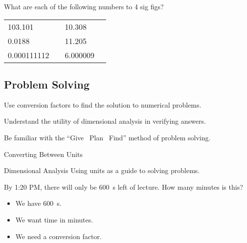 \documentclass[notes=show]{beamer}
\begin{document}
\begin{onyourown}{0em}
	What are each of the following numbers to 4 sig figs?
	\begin{center}
		\renewcommand\arraystretch{2}
		\begin{tabularx}{\linewidth} {*{4}{X}}
			103.101 & & 10.308 & \\
			0.0188 & & 11.205 & \\
			0.000111112 & & 6.000009 & \\
		\end{tabularx}
	\end{center}
\end{onyourown}

\begin{frame}{}
	\section{Problem Solving}
	\begin{learningobjectives}
	\item Use conversion factors to find the solution to numerical problems.
	\item Understand the utility of dimensional analysis in verifying answers.
	\item Be familiar with the ``Give \textrightarrow\ Plan \textrightarrow\ Find'' method of problem solving.
	\end{learningobjectives}
\end{frame}


\begin{frame}{Converting Between Units}
	\begin{block}{Dimensional Analysis}
		Using units as a guide to solving problems.
	\end{block}

	By 1:20 PM, there will only be \SI{600}{\second} left of lecture. How many
	minutes is this?

	\begin{itemize}
		\item<2-> We have \alert{\SI{600}{\second}}.
		\item<3-> We want \alert{time in minutes}.
		\item<4-> We need \alert{a conversion factor}.
	\end{itemize}

\end{frame}
\end{document}
